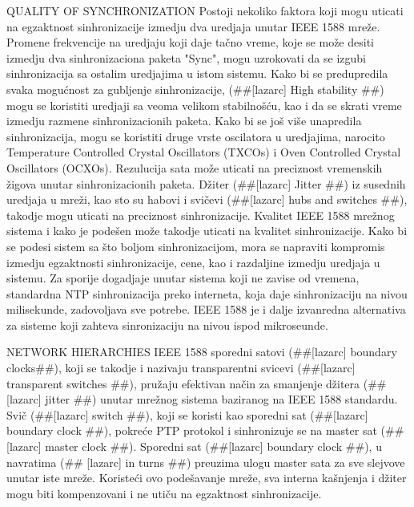 \documentclass[a4paper,12pt, master]{etf}
\begin{document}
	QUALITY OF SYNCHRONIZATION
	Postoji nekoliko faktora koji mogu uticati na egzaktnost sinhronizacije izmedju dva 
	uredjaja unutar IEEE 1588 mre\v{z}e. Promene frekvencije na uredjaju koji daje ta\v{c}no vreme, 
	koje se mo\v{z}e desiti izmedju dva sinhronizaciona paketa "Sync", mogu uzrokovati da se 
	izgubi sinhronizacija sa ostalim uredjajima u istom sistemu. Kako bi se predupredila 
	svaka mogu\'{c}nost za gubljenje sinhronizacije, (\#\#[lazarc] High stability \#\#) mogu se 
	koristiti uredjaji sa veoma velikom stabilno\v{s}\'{c}u, kao i da se skrati vreme izmedju razmene 
	sinhronizacionih paketa. Kako bi se jo\v{s} vi\v{s}e unapredila sinhronizacija, mogu se koristiti 
	druge vrste oscilatora u uredjajima, narocito Temperature Controlled Crystal Oscillators 
	(TXCOs) i Oven Controlled Crystal Oscillators (OCXOs). Rezulucija sata mo\v{z}e uticati na 
	preciznost vremenskih \v{z}igova unutar sinhronizacionih paketa. D\v{z}iter (\#\#[lazarc] Jitter 
	\#\#) iz susednih uredjaja u mre\v{z}i, kao sto su habovi i svi\v{c}evi (\#\#[lazarc] hubs and 
	switches \#\#), takodje mogu uticati na preciznost sinhronizacije. Kvalitet IEEE 1588 
	mre\v{z}nog sistema i kako je pode\v{s}en mo\v{z}e takodje uticati na kvalitet sinhronizacije. Kako bi 
	se podesi sistem sa \v{s}to boljom sinhronizacijom, mora se napraviti kompromis izmedju 
	egzaktnosti sinhronizacije, cene, kao i razdaljine izmedju uredjaja u sistemu. Za sporije 
	dogadjaje unutar sistema koji ne zavise od vremena, standardna NTP sinhronizacija preko 
	interneta, koja daje sinhronizaciju na nivou milisekunde, zadovoljava sve potrebe. IEEE 
	1588 je i dalje izvanredna alternativa za sisteme koji zahteva sinronizaciju na nivou ispod 
	mikroseunde.
	
	NETWORK HIERARCHIES
	IEEE 1588 sporedni satovi (\#\#[lazarc] boundary clocks\#\#), koji se takodje i nazivaju 
	transparentni svicevi (\#\#[lazarc] transparent switches \#\#), pru\v{z}aju efektivan na\v{c}in za 
	smanjenje d\v{z}itera (\#\#[lazarc] jitter \#\#) unutar mre\v{z}nog sistema baziranog na IEEE 1588 
	standardu. Svi\v{c} (\#\#[lazarc] switch \#\#), koji se koristi kao sporedni sat (\#\#[lazarc] 
	boundary clock \#\#), pokre\'{c}e PTP protokol i sinhronizuje se na master sat (\#\#[lazarc] 
	master clock \#\#). Sporedni sat (\#\#[lazarc] boundary clock \#\#), u navratima (\#\#
	[lazarc] in turns \#\#) preuzima ulogu master sata za sve slejvove unutar iste mre\v{z}e. 
    Koriste\'{c}i ovo pode\v{s}avanje mre\v{z}e, sva interna ka\v{s}njenja i d\v{z}iter mogu biti 
    kompenzovani i ne uti\v{c}u na egzaktnost sinhronizacije.
	
\end{document}
